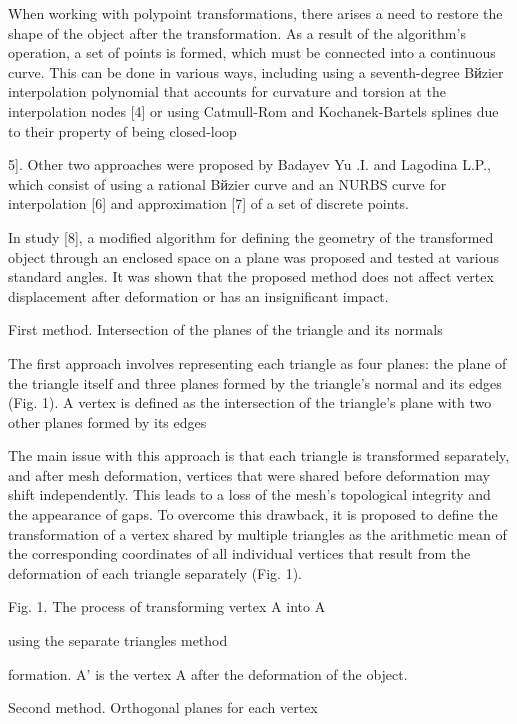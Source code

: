 \documentclass[12pt,a4paper]{article}
\begin{document}
\par
When working with polypoint transformations, there arises a need to restore the shape of the object after the transformation. As a result of the algorithm’s operation, a set of points is formed, which must be connected into a continuous curve. This can be done in various ways, including using a seventh-degree Bйzier interpolation polynomial that accounts for curvature and torsion at the interpolation nodes [4] or using Catmull-Rom and Kochanek-Bartels splines due to their property of being closed-loop
\par
5]. Other two approaches were proposed by Badayev Yu .I. and Lagodina L.P., which consist of using a rational Bйzier curve and an NURBS curve for interpolation [6] and approximation [7] of a set of discrete points.
\par
In study [8], a modified algorithm for defining the geometry of the transformed object through an enclosed space on a plane was proposed and tested at various standard angles. It was shown that the proposed method does not affect vertex displacement after deformation or has an insignificant impact.
\par
First method. Intersection of the planes of the triangle and its normals
\par
The first approach involves representing each triangle as four planes: the plane of the triangle itself and three planes formed by the triangle's normal and its edges (Fig. 1). A vertex is defined as the intersection of the triangle's plane with two other planes formed by its edges
\par
The main issue with this approach is that each triangle is transformed separately, and after mesh deformation, vertices that were shared before deformation may shift independently. This leads to a loss of the mesh’s topological integrity and the appearance of gaps. To overcome this drawback, it is proposed to define the transformation of a vertex shared by multiple triangles as the arithmetic mean of the corresponding coordinates of all individual vertices that result from the deformation of each triangle separately (Fig. 1).
\par
Fig. 1. The process of transforming vertex A into A
\par
using the separate triangles method
\par
formation. A' is the vertex A after the deformation of the object.
\par
Second method. Orthogonal planes for each vertex
\par
\end{document}
